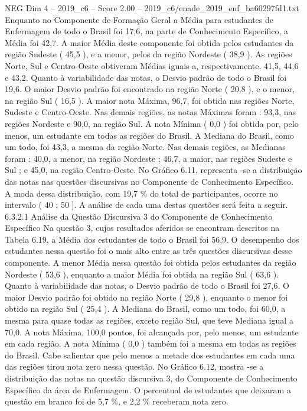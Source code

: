 \begin{textsample}{NEG Dim 4 – 2019\_c6 – Score 2.00 – 2019\_c6/enade\_2019\_enf\_ba60297fd1.txt}
Enquanto no Componente de Formação Geral a Média para estudantes de Enfermagem de todo o Brasil foi 17,6, na parte de Conhecimento Específico, a Média foi 42,7.
A maior Média deste componente foi obtida pelos estudantes da região Sudeste ( 45,5 ), e a menor, pelos da região Nordeste ( 38,9 ).
As regiões Norte, Sul e Centro-Oeste obtiveram Médias iguais a, respectivamente, 41,5, 44,6 e 43,2.
Quanto à variabilidade das notas, o Desvio padrão de todo o Brasil foi 19,6.
O maior Desvio padrão foi encontrado na região Norte ( 20,8 ), e o menor, na região Sul ( 16,5 ).
A maior nota Máxima, 96,7, foi obtida nas regiões Norte, Sudeste e Centro-Oeste.
Nas demais regiões, as notas Máximas foram : 93,3, nas regiões Nordeste e 90,0, na região Sul.
A nota Mínima ( 0,0 ) foi obtida por, pelo menos, um estudante em todas as regiões do Brasil.
A Mediana do Brasil, como um todo, foi 43,3, a mesma da região Norte.
Nas demais regiões, as Medianas foram : 40,0, a menor, na região Nordeste ; 46,7, a maior, nas regiões Sudeste e Sul ; e 45,0, na região Centro-Oeste.
No Gráfico 6.11, representa -se a distribuição das notas nas questões discursivas no Componente de Conhecimento Específico.
A moda dessa distribuição, com 19,7 \% do total de participantes, ocorre no intervalo ( 40 ; 50 ].
A análise de cada uma destas questões será feita a seguir. 6.3.2.1 Análise da Questão Discursiva 3 do Componente de Conhecimento Específico Na questão 3, cujos resultados aferidos se encontram descritos na Tabela 6.19, a Média dos estudantes de todo o Brasil foi 56,9.
O desempenho dos estudantes nessa questão foi o mais alto entre as três questões discursivas desse componente.
A menor Média nessa questão foi obtida pelos estudantes da região Nordeste ( 53,6 ), enquanto a maior Média foi obtida na região Sul ( 63,6 ).
Quanto à variabilidade das notas, o Desvio padrão de todo o Brasil foi 27,6.
O maior Desvio padrão foi obtido na região Norte ( 29,8 ), enquanto o menor foi obtido na região Sul ( 25,4 ).
A Mediana do Brasil, como um todo, foi 60,0, a mesma para quase todas as regiões, exceto região Sul, que teve Mediana igual a 70,0.
A nota Máxima, 100,0 pontos, foi alcançada por, pelo menos, um estudante em cada região.
A nota Mínima ( 0,0 ) também foi a mesma em todas as regiões do Brasil.
Cabe salientar que pelo menos a metade dos estudantes em cada uma das regiões tirou nota zero nessa questão.
No Gráfico 6.12, mostra -se a distribuição das notas na questão discursiva 3, do Componente de Conhecimento Específico da área de Enfermagem.
O percentual de estudantes que deixaram a questão em branco foi de 5,7 \%, e 2,2 \% receberam nota zero.

\end{textsample}
